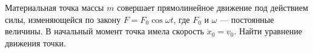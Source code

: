 Материальная точка массы $m$ совершает прямолинейное движение под
действием силы, изменяющейся по закону $F=F_0 \cos \omega t$, где $F_0$
и $\omega$ --- постоянные величины. В начальный момент точка имела
скорость $\dot x_0=v_0$. Найти уравнение движения точки.
